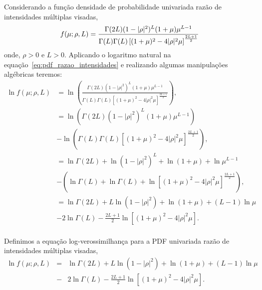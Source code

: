 Considerando a função densidade de probabilidade univariada razão de intensidades múltiplas visadas,
\begin{equation}\label{eq:pdf_razao_intensidades}
	f(\mu;\rho,L)=\frac{\Gamma(2L)(1-|\rho|^2)^{L}(1+\mu)\mu^{L-1}}{\Gamma(L)\Gamma(L)\left[(1+\mu)^2-4|\rho|^2\mu \right]^{\frac{2L+1}{2}}}\\
\end{equation}
onde, $\rho>0$ e $L>0$. Aplicando o logaritmo natural na equação~\eqref{eq:pdf_razao_intensidades} e realizando algumas manipulações algébricas teremos:
\begin{equation}\nonumber
\begin{split}
	\ln f(\mu;\rho,L)&=\ln\left(\frac{\Gamma(2L)(1-|\rho|^2)^{L}(1+\mu)\mu^{L-1}}{\Gamma(L)\Gamma(L)\left[(1+\mu)^2-4|\rho|^2\mu \right]^{\frac{2L+1}{2}}}\right),\\
	                &=\ln\left(\Gamma(2L)(1-|\rho|^2)^{L}(1+\mu)\mu^{L-1}\right)\\
	                &-\ln\left(\Gamma(L)\Gamma(L)\left[(1+\mu)^2-4|\rho|^2\mu \right]^{\frac{2L+1}{2}}\right),\\
	                &=\ln\Gamma(2L) +\ln(1-|\rho|^2)^{L}+\ln(1+\mu)+\ln\mu^{L-1}\\
	                &-\left(\ln\Gamma(L)+\ln\Gamma(L)+\ln\left[(1+\mu)^2-4|\rho|^2\mu \right]^{\frac{2L+1}{2}}\right),\\
	                &=\ln\Gamma(2L) +L\ln(1-|\rho|^2)+\ln(1+\mu)+(L-1)\ln\mu\\
	                &-2\ln\Gamma(L)-\frac{2L+1}{2}\ln\left[(1+\mu)^2-4|\rho|^2\mu \right].\\
\end{split}
\end{equation}

Definimos a equação log-verossimilhança para a PDF univariada razão de intensidades múltiplas visadas,
\begin{equation}\label{eq_log_vero_razao_intensidade}
\begin{array}{lcl}	
	\ln f(\mu;\rho,L)&=&\ln\Gamma(2L) +L\ln(1-|\rho|^2)+\ln(1+\mu)+(L-1)\ln\mu\\
	&-&2\ln\Gamma(L)-\frac{2L+1}{2}\ln\left[(1+\mu)^2-4|\rho|^2\mu \right].\\
\end{array}
\end{equation}

